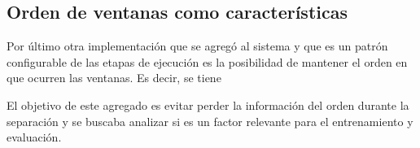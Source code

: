 \subsection{Orden de ventanas como características}

Por último otra implementación que se agregó al sistema y que es un patrón
configurable de las etapas de ejecución es la posibilidad de mantener el orden
en que ocurren las ventanas. Es decir, se tiene

\begin{table}[h!]
\centering
{}
 \caption{Ejemplos etiquetados a partir de un plan relajado y una acción}
 \label{tb:matrix_shape}
\end{table}

El objetivo de este agregado es evitar perder la información del orden durante
la separación y se buscaba analizar si es un factor relevante para el
entrenamiento y evaluación.